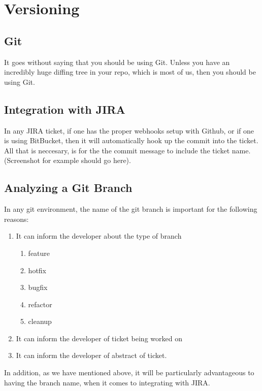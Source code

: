 \maketitle{}
\section{ Versioning }

\subsection { Git }
It goes without saying that you should be using Git. Unless you have an
incredibly huge diffing tree in your repo, which is most of us, then you should
be using Git.

\subsection { Integration with JIRA }
In any JIRA ticket, if one has the proper webhooks setup with Github, or if one
is using BitBucket, then it will automatically hook up the commit into the
ticket. All that is neccesary, is for the the commit message to include the
ticket name. (Screenshot for example should go here).

\subsection { Analyzing a Git Branch }
In any git environment, the name of the git branch is important for the
following reasons:

\begin{enumerate}
  \item It can inform the developer about the type of branch
    \begin{enumerate}
      \item feature
      \item hotfix
      \item bugfix
      \item refactor
      \item cleanup
    \end{enumerate}
  \item It can inform the developer of ticket being worked on
  \item It can inform the developer of abstract of ticket.
\end{enumerate}

In addition, as we have mentioned above, it will be particularly advantageous to
having the branch name, when it comes to integrating with JIRA.

